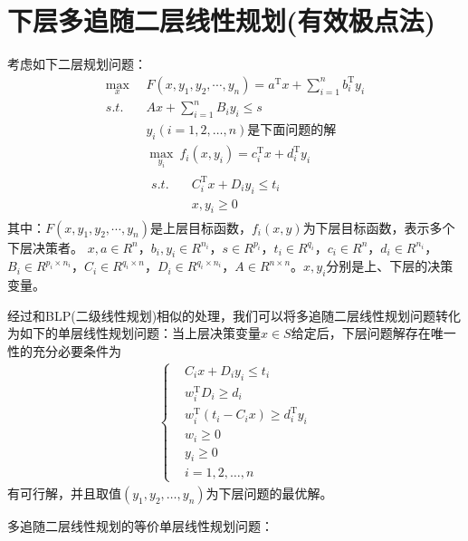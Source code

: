 \section{下层多追随二层线性规划(有效极点法)}
    \par
    考虑如下二层规划问题：
    \begin{align*}
        \mathop{\max}\limits_{x}\  &F(x,y_1,y_2,\cdots,y_n)=a^\mathrm{T} x+\mathop{\sum}\limits_{i=1}^nb_i^\mathrm{T} y_i\\
        s.t.\quad & Ax+\mathop{\sum}\limits_{i=1}^n B_iy_i\leqslant s\\
        &y_i(i=1,2,\ldots,n)\text{是下面问题的解}\\
        & \mathop{\max}\limits_{y_i}\  f_i(x,y_i)=c_i^\mathrm{T} x+d_i^\mathrm{T} y_i\\
       & \begin{aligned}
       s.t.\quad &C_i^\mathrm{T} x+D_iy_i\leqslant t_i\\
       &x,y_i \geqslant 0
       \end{aligned}
    \end{align*}
    其中：$F(x,y_1,y_2,\cdots,y_n)$是上层目标函数，$f_i(x,y)$为下层目标函数，表示多个下层决策者。
    $x,a\in R^{n}$，$b_i,y_i \in R^{n_i}$，$s\in R^{p_i}$，$t_i \in R^{q_i}$，$c_i\in R^{n}$，$d_i\in R^{n_i}$，$B_i\in R^{p_i\times n_i}$，$C_i\in R^{q_i\times n}$，$D_i\in R^{q_i\times n_i}$，$A \in R^{n\times n}$。$x,y_i$分别是上、下层的决策变量。
    \par
    经过和BLP(二级线性规划)相似的处理，我们可以将多追随二层线性规划问题转化为如下的单层线性规划问题：当上层决策变量$x\in S$给定后，下层问题解存在唯一性的充分必要条件为
    \begin{align*}
    \left\{\begin{aligned}
        & C_i x+D_iy_i\leqslant t_i\\
        & w_i^\mathrm{T} D_i\geqslant d_i\\
        & w_i^\mathrm{T} (t_i-C_ix)\geqslant d_i^\mathrm{T} y_i\\
        & w_i \geqslant 0\\
        & y_i \geqslant 0\\
        & i=1,2,\ldots,n
        \end{aligned}
            \right.
    \end{align*}
    有可行解，并且取值$(y_1,y_2,\ldots,y_n)$为下层问题的最优解。
    \par
    多追随二层线性规划的等价单层线性规划问题：
